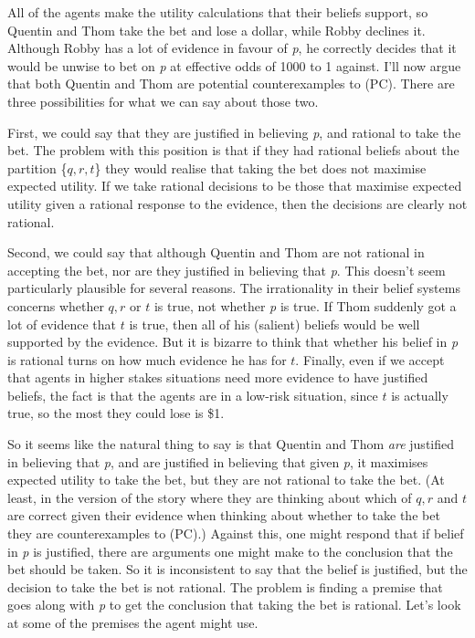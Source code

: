 \documentclass[
  11pt,
  letterpaper,
  DIV=11,
  numbers=noendperiod,
  oneside]{scrartcl}
\begin{document}
All of the agents make the utility calculations that their beliefs
support, so Quentin and Thom take the bet and lose a dollar, while Robby
declines it. Although Robby has a lot of evidence in favour of \emph{p},
he correctly decides that it would be unwise to bet on \emph{p} at
effective odds of 1000 to 1 against. I'll now argue that both Quentin
and Thom are potential counterexamples to (PC). There are three
possibilities for what we can say about those two.

First, we could say that they are justified in believing \emph{p}, and
rational to take the bet. The problem with this position is that if they
had rational beliefs about the partition \{\(q, r, t\)\} they would
realise that taking the bet does not maximise expected utility. If we
take rational decisions to be those that maximise expected utility given
a rational response to the evidence, then the decisions are clearly not
rational.

Second, we could say that although Quentin and Thom are not rational in
accepting the bet, nor are they justified in believing that \emph{p}.
This doesn't seem particularly plausible for several reasons. The
irrationality in their belief systems concerns whether \(q, r\) or \(t\)
is true, not whether \emph{p} is true. If Thom suddenly got a lot of
evidence that \(t\) is true, then all of his (salient) beliefs would be
well supported by the evidence. But it is bizarre to think that whether
his belief in \emph{p} is rational turns on how much evidence he has for
\(t\). Finally, even if we accept that agents in higher stakes
situations need more evidence to have justified beliefs, the fact is
that the agents are in a low-risk situation, since \(t\) is actually
true, so the most they could lose is \$1.

So it seems like the natural thing to say is that Quentin and Thom
\emph{are} justified in believing that \emph{p}, and are justified in
believing that given \emph{p}, it maximises expected utility to take the
bet, but they are not rational to take the bet. (At least, in the
version of the story where they are thinking about which of \(q, r\) and
\(t\) are correct given their evidence when thinking about whether to
take the bet they are counterexamples to (PC).) Against this, one might
respond that if belief in \emph{p} is justified, there are arguments one
might make to the conclusion that the bet should be taken. So it is
inconsistent to say that the belief is justified, but the decision to
take the bet is not rational. The problem is finding a premise that goes
along with \emph{p} to get the conclusion that taking the bet is
rational. Let's look at some of the premises the agent might use.
\end{document}
